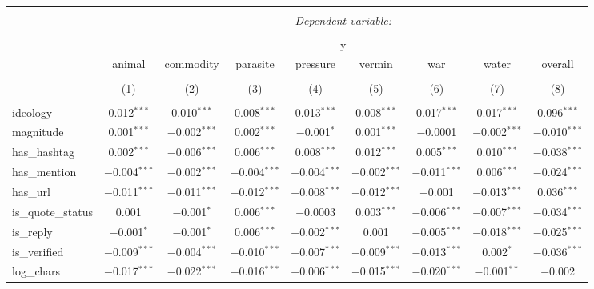
\begin{table}[!htbp] \centering 
  \caption{} 
  \label{} 
\begin{tabular}{@{\extracolsep{5pt}}lcccccccc} 
\\[-1.8ex]\hline 
\hline \\[-1.8ex] 
 & \multicolumn{8}{c}{\textit{Dependent variable:}} \\ 
\cline{2-9} 
\\[-1.8ex] & \multicolumn{8}{c}{y} \\ 
 & animal & commodity & parasite & pressure & vermin & war & water & overall \\ 
\\[-1.8ex] & (1) & (2) & (3) & (4) & (5) & (6) & (7) & (8)\\ 
\hline \\[-1.8ex] 
 ideology & 0.012$^{***}$ & 0.010$^{***}$ & 0.008$^{***}$ & 0.013$^{***}$ & 0.008$^{***}$ & 0.017$^{***}$ & 0.017$^{***}$ & 0.096$^{***}$ \\ 
  magnitude & 0.001$^{***}$ & $-$0.002$^{***}$ & 0.002$^{***}$ & $-$0.001$^{*}$ & 0.001$^{***}$ & $-$0.0001 & $-$0.002$^{***}$ & $-$0.010$^{***}$ \\ 
  has\_hashtag & 0.002$^{***}$ & $-$0.006$^{***}$ & 0.006$^{***}$ & 0.008$^{***}$ & 0.012$^{***}$ & 0.005$^{***}$ & 0.010$^{***}$ & $-$0.038$^{***}$ \\ 
  has\_mention & $-$0.004$^{***}$ & $-$0.002$^{***}$ & $-$0.004$^{***}$ & $-$0.004$^{***}$ & $-$0.002$^{***}$ & $-$0.011$^{***}$ & 0.006$^{***}$ & $-$0.024$^{***}$ \\ 
  has\_url & $-$0.011$^{***}$ & $-$0.011$^{***}$ & $-$0.012$^{***}$ & $-$0.008$^{***}$ & $-$0.012$^{***}$ & $-$0.001 & $-$0.013$^{***}$ & 0.036$^{***}$ \\ 
  is\_quote\_status & 0.001 & $-$0.001$^{*}$ & 0.006$^{***}$ & $-$0.0003 & 0.003$^{***}$ & $-$0.006$^{***}$ & $-$0.007$^{***}$ & $-$0.034$^{***}$ \\ 
  is\_reply & $-$0.001$^{*}$ & $-$0.001$^{*}$ & 0.006$^{***}$ & $-$0.002$^{***}$ & 0.001 & $-$0.005$^{***}$ & $-$0.018$^{***}$ & $-$0.025$^{***}$ \\ 
  is\_verified & $-$0.009$^{***}$ & $-$0.004$^{***}$ & $-$0.010$^{***}$ & $-$0.007$^{***}$ & $-$0.009$^{***}$ & $-$0.013$^{***}$ & 0.002$^{*}$ & $-$0.036$^{***}$ \\ 
  log\_chars & $-$0.017$^{***}$ & $-$0.022$^{***}$ & $-$0.016$^{***}$ & $-$0.006$^{***}$ & $-$0.015$^{***}$ & $-$0.020$^{***}$ & $-$0.001$^{**}$ & $-$0.002 \\ 

\end{tabular}
\end{table}

